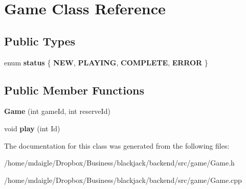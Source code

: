 \hypertarget{classGame}{
\section{\-Game \-Class \-Reference}
\label{classGame}
}
\subsection*{\-Public \-Types}
\begin{DoxyCompactItemize}
\item 
enum {\bfseries status} \{ {\bfseries \-N\-E\-W}, 
{\bfseries \-P\-L\-A\-Y\-I\-N\-G}, 
{\bfseries \-C\-O\-M\-P\-L\-E\-T\-E}, 
{\bfseries \-E\-R\-R\-O\-R}
 \}
\end{DoxyCompactItemize}
\subsection*{\-Public \-Member \-Functions}
\begin{DoxyCompactItemize}
\item 
\hypertarget{classGame_a4da6bd8011ce4545f766a3ea1a6c49f5}{
{\bfseries \-Game} (int game\-Id, int reserve\-Id)}
\label{classGame_a4da6bd8011ce4545f766a3ea1a6c49f5}

\item 
\hypertarget{classGame_a892e25a1b0166e4d86db8cb8cd7dc089}{
void {\bfseries play} (int \-Id)}
\label{classGame_a892e25a1b0166e4d86db8cb8cd7dc089}

\end{DoxyCompactItemize}


\-The documentation for this class was generated from the following files\-:\begin{DoxyCompactItemize}
\item 
/home/mdaigle/\-Dropbox/\-Business/blackjack/backend/src/game/\-Game.\-h\item 
/home/mdaigle/\-Dropbox/\-Business/blackjack/backend/src/game/\-Game.\-cpp\end{DoxyCompactItemize}
